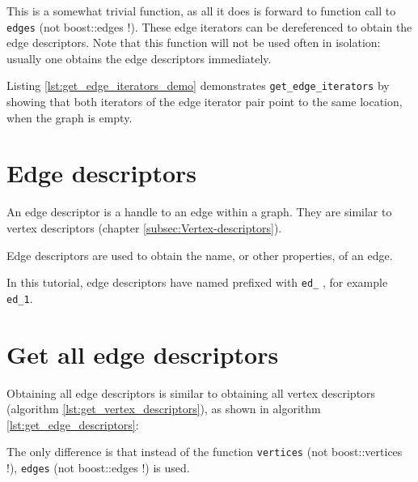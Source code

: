 This is a somewhat trivial function, as all it does is forward to function
call to \verb;edges; 
(not boost::edges !). 
These edge iterators can be dereferenced to obtain the edge descriptors.
Note that this function will not be used often in isolation: usually one
obtains the edge descriptors immediately.

Listing \ref{lst:get_edge_iterators_demo}
demonstrates \verb;get_edge_iterators; by showing that both iterators of the
edge iterator pair point to the same location, when the graph is empty.



\section{Edge descriptors}
\label{subsec:Edge-descriptors}

An edge descriptor is a handle to an edge within a graph.
They are similar to vertex descriptors (chapter \ref{subsec:Vertex-descriptors}).

Edge descriptors are used to obtain the name, or other properties, of an edge.

In this tutorial, edge descriptors have named prefixed with \verb;ed_;
, for example \verb;ed_1;.

\section{Get all edge descriptors}
\label{subsec:get_edge_descriptors}

Obtaining all edge descriptors is similar to obtaining all vertex descriptors
(algorithm \ref{lst:get_vertex_descriptors}), 
as shown in algorithm \ref{lst:get_edge_descriptors}:



The only difference is that instead of the 
function \verb;vertices; 
(not boost::vertices !), 
\verb;edges;  
(not boost::edges !) is used.

